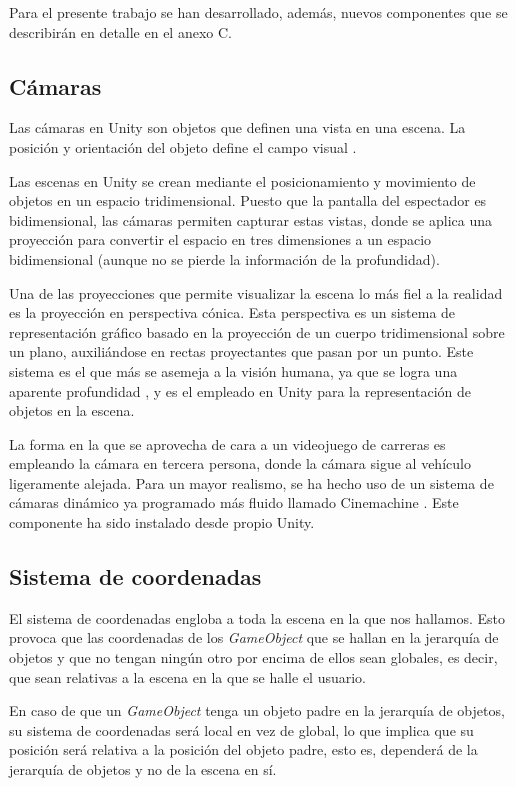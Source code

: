 Para el presente trabajo se han desarrollado, además, nuevos componentes que se describirán en detalle en el anexo C.

\subsection{Cámaras}

Las cámaras en Unity son objetos que definen una vista en una escena. La posición y orientación del objeto define el campo visual \cite{doc:cameras}.

Las escenas en Unity se crean mediante el posicionamiento y movimiento de objetos en un espacio tridimensional. Puesto que la pantalla del espectador es bidimensional, las cámaras permiten capturar estas vistas, donde se aplica una proyección para convertir el espacio en tres dimensiones a un espacio bidimensional (aunque no se pierde la información de la profundidad).

Una de las proyecciones que permite visualizar la escena lo más fiel a la realidad es la proyección en perspectiva cónica. Esta perspectiva es un sistema de representación gráfico basado en la proyección de un cuerpo tridimensional sobre un plano, auxiliándose en rectas proyectantes que pasan por un punto. Este sistema es el que más se asemeja a la visión humana, ya que se logra una aparente profundidad \cite{eduxg:perscon}, y es el empleado en Unity para la representación de objetos en la escena.

La forma en la que se aprovecha de cara a un videojuego de carreras es empleando la cámara en tercera persona, donde la cámara sigue al vehículo ligeramente alejada. Para un mayor realismo, se ha hecho uso de un sistema de cámaras dinámico ya programado más fluido llamado Cinemachine \cite{doc:cinemachine}. Este componente ha sido instalado desde propio Unity.

\subsection{Sistema de coordenadas}

El sistema de coordenadas engloba a toda la escena en la que nos hallamos. Esto provoca que las coordenadas de los \textit{GameObject} que se hallan en la jerarquía de objetos y que no tengan ningún otro por encima de ellos sean globales, es decir, que sean relativas a la escena en la que se halle el usuario. 

En caso de que un \textit{GameObject} tenga un objeto padre en la jerarquía de objetos, su sistema de coordenadas será local en vez de global, lo que implica que su posición será relativa a la posición del objeto padre, esto es, dependerá de la jerarquía de objetos y no de la escena en sí.

